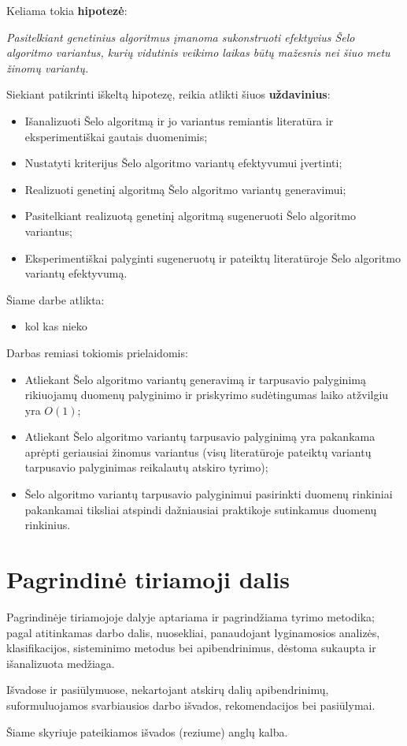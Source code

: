 \documentclass{VUMIFInfBakalaurinis}
\begin{document}
Keliama tokia \textbf{hipotezė}:

\textit{Pasitelkiant genetinius algoritmus įmanoma sukonstruoti efektyvius Šelo algoritmo variantus,
kurių vidutinis veikimo laikas būtų mažesnis nei šiuo metu žinomų variantų.}


Siekiant patikrinti iškeltą hipotezę, reikia atlikti šiuos \textbf{uždavinius}:
\begin{itemize}
    \item Išanalizuoti Šelo algoritmą ir jo variantus remiantis literatūra ir eksperimentiškai gautais duomenimis;
    \item Nustatyti kriterijus Šelo algoritmo variantų efektyvumui įvertinti;
    \item Realizuoti genetinį algoritmą Šelo algoritmo variantų generavimui;
    \item Pasitelkiant realizuotą genetinį algoritmą sugeneruoti Šelo algoritmo variantus;
    \item Eksperimentiškai palyginti sugeneruotų ir pateiktų literatūroje Šelo algoritmo variantų efektyvumą.
  \end{itemize}

Šiame darbe atlikta:
\begin{itemize}
    \item kol kas nieko
\end{itemize}

Darbas remiasi tokiomis prielaidomis:
\begin{itemize}
    \item Atliekant Šelo algoritmo variantų generavimą ir tarpusavio palyginimą rikiuojamų duomenų palyginimo ir priskyrimo sudėtingumas laiko atžvilgiu yra $O(1)$;
    \item Atliekant Šelo algoritmo variantų tarpusavio palyginimą yra pakankama aprėpti geriausiai žinomus variantus
        (visų literatūroje pateiktų variantų tarpusavio palyginimas reikalautų atskiro tyrimo);
    \item Šelo algoritmo variantų tarpusavio palyginimui pasirinkti duomenų rinkiniai pakankamai tiksliai atspindi dažniausiai praktikoje sutinkamus duomenų rinkinius.
\end{itemize}


\section{Pagrindinė tiriamoji dalis}
Pagrindinėje tiriamojoje dalyje aptariama ir pagrindžiama tyrimo metodika; pagal
atitinkamas darbo dalis, nuosekliai, panaudojant lyginamosios analizės, klasifikacijos,
sisteminimo metodus bei apibendrinimus, dėstoma sukaupta ir išanalizuota medžiaga. 

Išvadose ir pasiūlymuose, nekartojant atskirų dalių apibendrinimų,
suformuluojamos svarbiausios darbo išvados, rekomendacijos bei pasiūlymai.

Šiame skyriuje pateikiamos išvados (reziume) anglų kalba.


\printbibliography[heading=bibintoc]

\appendix  %
\end{document}
